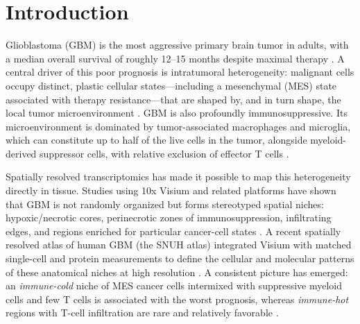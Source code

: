 \documentclass[11pt,letterpaper]{article}
\begin{document}
\begin{abstract}
\noindent\textbf{Conclusions.} DeepGraph-GBM provides an interpretable and fully reproducible framework for mapping immunosuppressive niches in GBM, and a rigorous benchmark showing that---contrary to the prevailing assumption---graph structure does not improve spatial niche prediction over a per-spot multilayer perceptron for this task. The non-significant survival association further underscores that spatial niche composition alone is insufficient for outcome prediction in this setting. All code, data, trained weights, and figures are openly released.

\vspace{0.5em}
\noindent\textbf{Keywords:} glioblastoma; spatial transcriptomics; graph neural network; Visium; tumor microenvironment; mesenchymal; immunosuppression
\end{abstract}

\clearpage

\section{Introduction}

Glioblastoma (GBM) is the most aggressive primary brain tumor in adults, with a median overall survival of roughly 12--15 months despite maximal therapy \cite{tcga2008}. A central driver of this poor prognosis is intratumoral heterogeneity: malignant cells occupy distinct, plastic cellular states---including a mesenchymal (MES) state associated with therapy resistance---that are shaped by, and in turn shape, the local tumor microenvironment \cite{neftel2019,greenwald2024}. GBM is also profoundly immunosuppressive. Its microenvironment is dominated by tumor-associated macrophages and microglia, which can constitute up to half of the live cells in the tumor, alongside myeloid-derived suppressor cells, with relative exclusion of effector T cells \cite{khan2023,lin2024,decordova2020}.

Spatially resolved transcriptomics has made it possible to map this heterogeneity directly in tissue. Studies using 10x Visium and related platforms have shown that GBM is not randomly organized but forms stereotyped spatial niches: hypoxic/necrotic cores, perinecrotic zones of immunosuppression, infiltrating edges, and regions enriched for particular cancer-cell states \cite{ravi2022,greenwald2024,stahl2016}. A recent spatially resolved atlas of human GBM (the SNUH atlas) integrated Visium with matched single-cell and protein measurements to define the cellular and molecular patterns of these anatomical niches at high resolution \cite{park2026}. A consistent picture has emerged: an \emph{immune-cold} niche of MES cancer cells intermixed with suppressive myeloid cells and few T cells is associated with the worst prognosis, whereas \emph{immune-hot} regions with T-cell infiltration are rare and relatively favorable \cite{greenwald2024,lin2024}.
\end{document}
